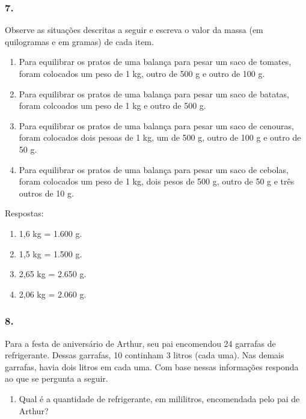 \begin{enumerate}
\begin{escolha}
\begin{enumerate}
\begin{itemize}
\begin{itemize}
\begin{escolha}
\subsubsection{7.}\label{section-45}

Observe as situações descritas a seguir e escreva o valor da massa (em quilogramas e em gramas) de cada item.

\begin{enumerate}
\def\labelenumi{\alph{enumi})}
\item
  Para equilibrar os pratos de uma balança para pesar um saco de tomates, foram colocados um peso de 1 kg, outro de 500 g e outro de 100 g.
\item
  Para equilibrar os pratos de uma balança para pesar um saco de batatas, foram colcoados um peso de 1 kg e outro de 500 g.
\item
  Para equilibrar os pratos de uma balança para pesar um saco de cenouras, foram colocados dois pesoas de 1 kg, um de 500 g, outro de 100 g e outro de 50 g.
\item
  Para equilibrar os pratos de uma balança para pesar um saco de cebolas, foram colocados um peso de 1 kg, dois pesos de 500 g, outro de 50 g e três outros de 10 g.
\end{enumerate}

Respostas:

\begin{enumerate}
\def\labelenumi{\alph{enumi})}
\item
  1,6 kg = 1.600 g.
\item
  1,5 kg = 1.500 g.
\item
  2,65 kg = 2.650 g.
\item
  2,06 kg = 2.060 g.
\end{enumerate}

\subsubsection{8.}\label{section-46}

Para a festa de aniversário de Arthur, seu pai encomendou 24 garrafas de
refrigerante. Dessas garrafas, 10 continham 3 litros (cada uma). Nas
demais garrafas, havia dois litros em cada uma. Com base nessas
informações responda ao que se pergunta a seguir.

\begin{enumerate}
\def\labelenumi{\alph{enumi})}
\item
  Qual é a quantidade de refrigerante, em mililitros, encomendada pelo pai de Arthur?
\end{enumerate}


\end{escolha}
\end{itemize}
\end{itemize}
\end{enumerate}
\end{escolha}
\end{enumerate}
